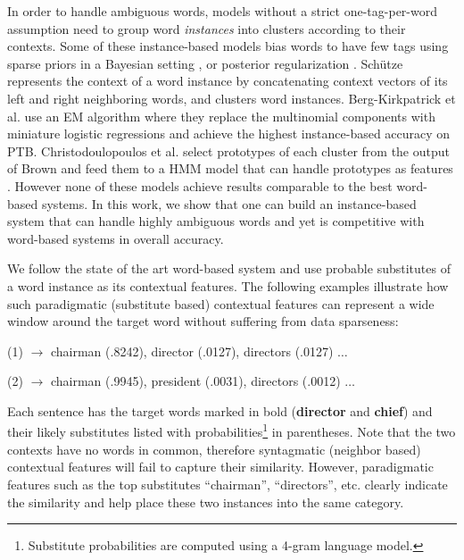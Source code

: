 In order to handle ambiguous words, models without a strict one-tag-per-word
assumption need to group word {\em instances} into clusters according to their
contexts.  Some of these instance-based models bias words to have few tags
using sparse priors in a Bayesian setting
\cite{goldwater-griffiths:2007:ACLMain,johnson:2007:EMNLP-CoNLL2007,Gao:2008:CBE:1613715.1613761},
or posterior regularization \cite{Ganchev:2010:PRS:1859890.1859918}.
Sch\"{u}tze  represents the context of a word instance
by concatenating context vectors of its left and right neighboring words, and
clusters word instances.  Berg-Kirkpatrick et al.
 use an EM algorithm where they
replace the multinomial components with miniature logistic regressions and
achieve the highest instance-based accuracy on PTB.  Christodoulopoulos et al.
 select prototypes of
each cluster from the output of  Brown  and
feed them to a HMM model that can handle prototypes as features 
\cite{Haghighi:2006:PLS:1220835.1220876}.  However none
of these models achieve results comparable to the best word-based systems.  In
this work, we show that one can build an
instance-based system that can handle highly ambiguous words and yet is
competitive with word-based systems in overall accuracy.

We follow the state of the art word-based system
\cite{yatbaz-sert-yuret:2012:EMNLP-CoNLL} and use probable substitutes
of a word instance as its contextual features.  The following examples
illustrate how such paradigmatic (substitute based) contextual
features can represent a wide window around the target word without
suffering from data sparseness:

(1)  $\rightarrow$ chairman
(.8242), director (.0127), directors (.0127) $\ldots$

(2)  $\rightarrow$ chairman
(.9945), president (.0031), directors (.0012) $\ldots$

Each sentence has the target words marked in bold ({\bf director} and
{\bf chief}) and their likely substitutes listed with
probabilities\footnote{Substitute probabilities are computed using a
  4-gram language model.} in parentheses.  Note that the two contexts
have no words in common, therefore syntagmatic (neighbor based)
contextual features will fail to capture their similarity.  However,
paradigmatic features such as the top substitutes ``chairman'',
``directors'', etc.  clearly indicate the similarity and help place
these two instances into the same category.

